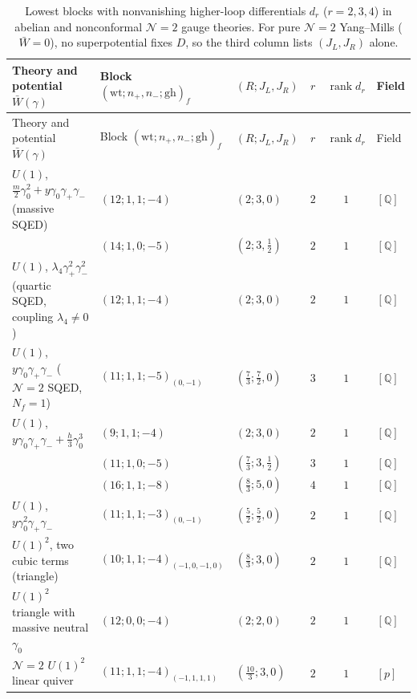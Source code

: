 \documentclass[11pt]{article}
\numberwithin{equation}{section}
\numberwithin{figure}{section}
\numberwithin{table}{section}
\begin{document}
{\footnotesize\renewcommand{\arraystretch}{1.26}\setlength{\tabcolsep}{3.5pt}
\begin{xltabular}{\linewidth}{|>{\raggedright\arraybackslash}X|l|l|c|c|l|}
\caption{Lowest blocks with nonvanishing higher-loop differentials $d_r$ ($r=2,3,4$) in abelian and nonconformal $\mathcal N=2$ gauge theories. For pure $\mathcal N=2$ Yang--Mills ($\bar W=0$), no superpotential fixes $D$, so the third column lists $(J_L,J_R)$ alone.}\label{local-ch9-higher-lifts}\\
\hline
Theory and potential $\bar W(\gamma)$ & Block $(\mathrm{wt};n_+,n_-;\mathrm{gh})_f$ & $(R;J_L,J_R)$ & $r$ & $\operatorname{rank}d_r$ & Field\\
\hline\endfirsthead
\hline
Theory and potential $\bar W(\gamma)$ & Block $(\mathrm{wt};n_+,n_-;\mathrm{gh})_f$ & $(R;J_L,J_R)$ & $r$ & $\operatorname{rank}d_r$ & Field\\
\hline\endhead
$U(1)$, $\tfrac m2\gamma_0^2+y\gamma_0\gamma_+\gamma_-$ (massive SQED) & $(12;1,1;-4)$ & $(2;3,0)$ & $2$ & $1$ & $[\mathbb Q]$\\
 & $(14;1,0;-5)$ & $(2;3,\tfrac12)$ & $2$ & $1$ & $[\mathbb Q]$\\
\hline
$U(1)$, $\lambda_4\gamma_+^2\gamma_-^2$ (quartic SQED, coupling $\lambda_4\ne0$) & $(12;1,1;-4)$ & $(2;3,0)$ & $2$ & $1$ & $[\mathbb Q]$\\
\hline
$U(1)$, $y\gamma_0\gamma_+\gamma_-$ ($\mathcal N=2$ SQED, $N_f=1$) & $(11;1,1;-5)_{(0,-1)}$ & $(\tfrac73;\tfrac72,0)$ & $3$ & $1$ & $[\mathbb Q]$\\
\hline
$U(1)$, $y\gamma_0\gamma_+\gamma_-+\tfrac h3\gamma_0^3$ & $(9;1,1;-4)$ & $(2;3,0)$ & $2$ & $1$ & $[\mathbb Q]$\\
 & $(11;1,0;-5)$ & $(\tfrac73;3,\tfrac12)$ & $3$ & $1$ & $[\mathbb Q]$\\
 & $(16;1,1;-8)$ & $(\tfrac83;5,0)$ & $4$ & $1$ & $[\mathbb Q]$\\
\hline
$U(1)$, $y\gamma_0^2\gamma_+\gamma_-$ & $(11;1,1;-3)_{(0,-1)}$ & $(\tfrac52;\tfrac52,0)$ & $2$ & $1$ & $[\mathbb Q]$\\
\hline
$U(1)^2$, two cubic terms (triangle) & $(10;1,1;-4)_{(-1,0,-1,0)}$ & $(\tfrac83;3,0)$ & $2$ & $1$ & $[\mathbb Q]$\\
\hline
$U(1)^2$ triangle with massive neutral $\gamma_0$ & $(12;0,0;-4)$ & $(2;2,0)$ & $2$ & $1$ & $[\mathbb Q]$\\
\hline
$\mathcal N=2$ $U(1)^2$ linear quiver & $(11;1,1;-4)_{(-1,1,1,1)}$ & $(\tfrac{10}3;3,0)$ & $2$ & $1$ & $[p]$\\

\end{xltabular}}
\end{document}
